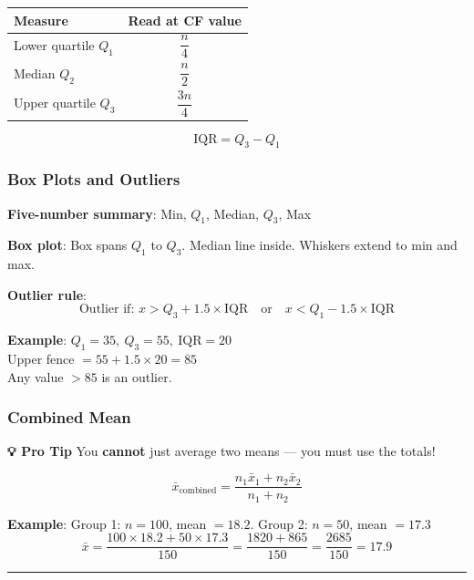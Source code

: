 \documentclass[
  letterpaper,
  DIV=11,
  numbers=noendperiod]{scrreprt}
\theoremstyle{definition}
\theoremstyle{remark}
\begin{document}
\begin{longtable}[]{@{}lc@{}}
\toprule\noalign{}
Measure & Read at CF value \\
\midrule\noalign{}
\endhead
\bottomrule\noalign{}
\endlastfoot
Lower quartile \(Q_1\) & \(\dfrac{n}{4}\) \\
Median \(Q_2\) & \(\dfrac{n}{2}\) \\
Upper quartile \(Q_3\) & \(\dfrac{3n}{4}\) \\
\end{longtable}

\[\text{IQR} = Q_3 - Q_1\]

\subsubsection*{Box Plots and Outliers}\label{box-plots-and-outliers}

\textbf{Five-number summary}: Min, \(Q_1\), Median, \(Q_3\), Max

\textbf{Box plot}: Box spans \(Q_1\) to \(Q_3\). Median line inside.
Whiskers extend to min and max.

\textbf{Outlier rule}:
\[\text{Outlier if: } x > Q_3 + 1.5 \times \text{IQR} \quad \text{or} \quad x < Q_1 - 1.5 \times \text{IQR}\]

\textbf{Example}: \(Q_1 = 35,\ Q_3 = 55,\ \text{IQR} = 20\)\\
Upper fence \(= 55 + 1.5 \times 20 = 85\)\\
Any value \(> 85\) is an outlier.

\subsubsection*{Combined Mean}\label{combined-mean}

\textbf{💡 Pro Tip} You \textbf{cannot} just average two means --- you
must use the totals!

\[\bar{x}_{\text{combined}} = \frac{n_1 \bar{x}_1 + n_2 \bar{x}_2}{n_1 + n_2}\]

\textbf{Example}: Group 1: \(n=100\), mean \(= 18.2\). Group 2:
\(n=50\), mean \(= 17.3\)
\[\bar{x} = \frac{100 \times 18.2 + 50 \times 17.3}{150} = \frac{1820 + 865}{150} = \frac{2685}{150} = 17.9\]

\begin{center}\rule{0.5\linewidth}{0.5pt}\end{center}
\end{document}

